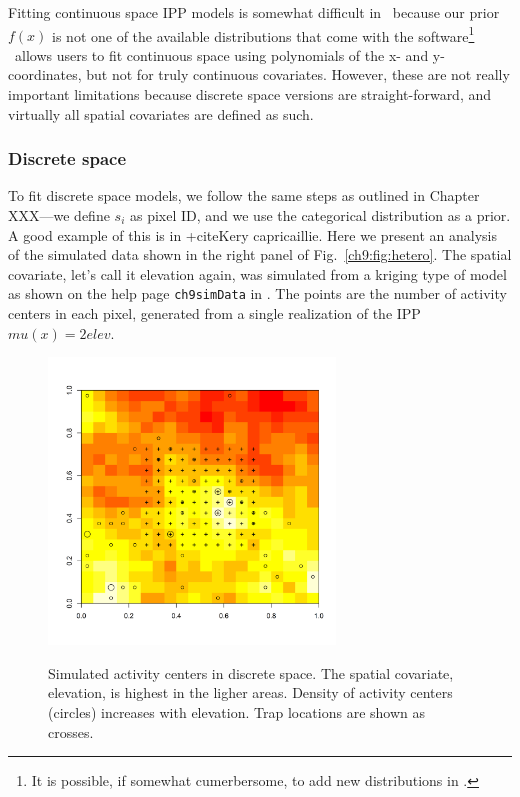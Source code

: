 Fitting continuous space IPP models is somewhat
difficult in \bugs~because our prior $f(x)$ is not one of the
available distributions that come with the software\footnote{It is
  possible, if somewhat
  cumerbersome, to add new distributions in \bugs.} \secr~allows
users to fit continuous space using polynomials of the x- and y-
coordinates, but not for truly continuous covariates. However, these
are not really important limitations because discrete
space versions are straight-forward, and virtually all spatial
covariates are defined as such.


\subsubsection{Discrete space}

To fit discrete space models, we follow the same steps
as outlined in Chapter XXX---we define $s_i$ as
pixel ID, and we use the categorical distribution as a prior. A good
example of this is in +cite{Kery capricaillie}. Here we present
an analysis of the simulated data shown in the right panel of
Fig.~\ref{ch9:fig:hetero}. The spatial covariate, let's call it
elevation again, was simulated
from a kriging type of model as shown on the help page
\verb+ch9simData+ in \scrbook. The points are the number of
activity centers in each pixel, generated from a single realization of
the IPP $mu(x) = 2elev$.


\begin{figure}
\centering
\includegraphics[width=3in,height=3in]{Ch11/figs/discrete}
\label{ch9:fig:discrete}
\caption{Simulated activity centers in discrete space. The spatial
  covariate, elevation, is highest in the ligher areas. Density of
  activity centers (circles) increases with elevation. Trap locations
  are shown as crosses.}
\end{figure}


